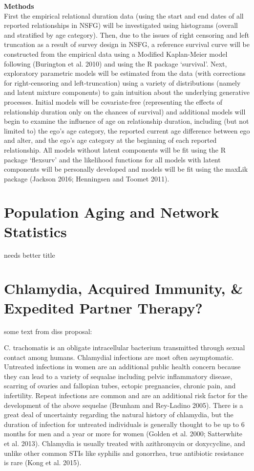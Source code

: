 \documentclass [11pt, proquest] {uwthesis}[2015/03/03]
\begin{document}
\textbf{Methods}\\
First the empirical relational duration data (using the start and end
dates of all reported relationships in NSFG) will be investigated using
histograms (overall and stratified by age category). Then, due to the
issues of right censoring and left truncation as a result of survey
design in NSFG, a reference survival curve will be constructed from the
empirical data using a Modified Kaplan-Meier model following (Burington
et al. 2010) and using the R package `survival'. Next, exploratory
parametric models will be estimated from the data (with corrections for
right-censoring and left-truncation) using a variety of distributions
(namely and latent mixture components) to gain intuition about the
underlying generative processes. Initial models will be covariate-free
(representing the effects of relationship duration only on the chances
of survival) and additional models will begin to examine the influence
of age on relationship duration, including (but not limited to) the
ego's age category, the reported current age difference between ego and
alter, and the ego's age category at the beginning of each reported
relationship. All models without latent components will be fit using the
R package `flexsurv' and the likelihood functions for all models with
latent components will be personally developed and models will be fit
using the maxLik package (Jackson 2016; Henningsen and Toomet 2011).

\chapter{Population Aging and Network Statistics}\label{nets}

needs better title

\chapter{Chlamydia, Acquired Immunity, \& Expedited Partner
Therapy?}\label{ept}

some text from diss proposal:

C. trachomatis is an obligate intracellular bacterium transmitted
through sexual contact among humans. Chlamydial infections are most
often asymptomatic. Untreated infections in women are an additional
public health concern because they can lead to a variety of sequalae
including pelvic inflammatory disease, scarring of ovaries and fallopian
tubes, ectopic pregnancies, chronic pain, and infertility. Repeat
infections are common and are an additional risk factor for the
development of the above sequelae (Brunham and Rey-Ladino 2005). There
is a great deal of uncertainty regarding the natural history of
chlamydia, but the duration of infection for untreated individuals is
generally thought to be up to 6 months for men and a year or more for
women (Golden et al. 2000; Satterwhite et al. 2013). Chlamydia is
usually treated with azithromycin or doxycycline, and unlike other
common STIs like syphilis and gonorrhea, true antibiotic resistance is
rare (Kong et al. 2015).
\end{document}
